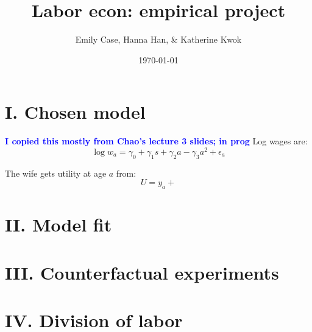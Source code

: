 \documentclass[11pt]{article}
\title{Labor econ: empirical project}
\author{Emily Case, Hanna Han, \& Katherine Kwok}
\date{\today}
\newcommand{\fix}[1]{\textcolor{blue}{\textbf{#1}}}
\begin{document}
\maketitle




\section*{I. Chosen model}
\fix{I copied this mostly from Chao's lecture 3 slides; in prog}
Log wages are:
\[ \log w_a = \gamma_0 +\gamma_1 s +\gamma_2 a - \gamma_3 a^2 + \epsilon_a \]

The wife gets utility at age $a$ from: 
	\[ U = y_a +  \]

\section*{II. Model fit}

\section*{III. Counterfactual experiments}

\section*{IV. Division of labor}
\end{document}

